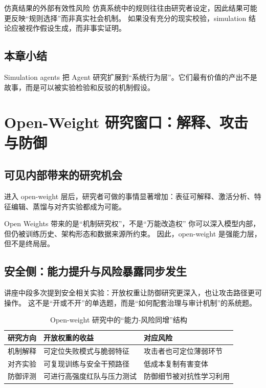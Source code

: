 \documentclass[a4paper]{article}
\begin{document}
\begin{warningbox}{仿真结果的外部有效性风险}
仿真系统中的规则往往由研究者设定，因此结果可能更反映“规则选择”而非真实社会机制。  
如果没有充分的现实校验，simulation 结论应被视作假设生成，而非事实证明。
\end{warningbox}

\subsection{本章小结}
Simulation agents 把 Agent 研究扩展到“系统行为层”。它们最有价值的产出不是故事，而是可以被实验检验和反驳的机制假设。


\section{Open-Weight 研究窗口：解释、攻击与防御}

\subsection{可见内部带来的研究机会}
进入 open-weight 层后，研究者可做的事情显著增加：表征可解释、激活分析、特征编辑、蒸馏与对齐实验都成为可能。

\begin{importantbox}{Open Weights 带来的是“机制研究权”，不是“万能改造权”}
你可以深入模型内部，但仍被训练历史、架构形态和数据来源所约束。  
因此，open-weight 是强能力层，但不是终局层。
\end{importantbox}

\subsection{安全侧：能力提升与风险暴露同步发生}
讲座中段多次提到安全相关实验：开放权重让防御研究更深入，也让攻击路径更可操作。  
这不是“开或不开”的单选题，而是“如何配套治理与审计机制”的系统题。

\begin{table}[H]
\centering
\begin{tabular}{p{2.8cm}p{4.0cm}p{4.8cm}}
\toprule
\textbf{研究方向} & \textbf{开放权重的收益} & \textbf{对应风险} \\
\midrule
机制解释 & 可定位失败模式与脆弱特征 & 攻击者也可定位薄弱环节 \\
对齐实验 & 可复现训练与安全干预路径 & 低成本复制有害变体 \\
防御评测 & 可进行高强度红队与压力测试 & 防御细节被对抗性学习利用 \\
\bottomrule
\end{tabular}
\caption{Open-weight 研究中的“能力-风险同增”结构}
\end{table}
\end{document}
